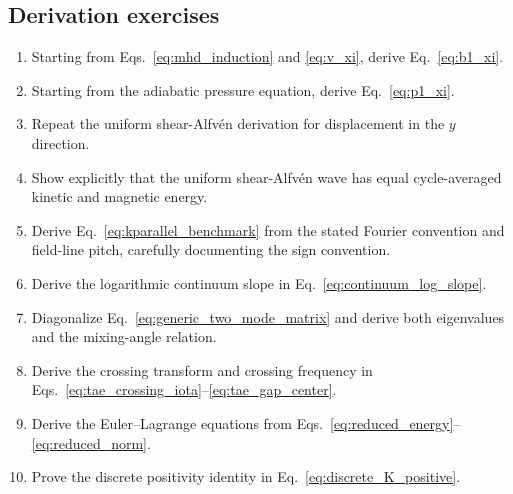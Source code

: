 \subsection{Derivation exercises}
\begin{enumerate}[leftmargin=1.8em]
\item Starting from Eqs.~\eqref{eq:mhd_induction} and \eqref{eq:v_xi}, derive Eq.~\eqref{eq:b1_xi}.
\item Starting from the adiabatic pressure equation, derive Eq.~\eqref{eq:p1_xi}.
\item Repeat the uniform shear-Alfv\'en derivation for displacement in the $y$ direction.
\item Show explicitly that the uniform shear-Alfv\'en wave has equal cycle-averaged kinetic and magnetic energy.
\item Derive Eq.~\eqref{eq:kparallel_benchmark} from the stated Fourier convention and field-line pitch, carefully documenting the sign convention.
\item Derive the logarithmic continuum slope in Eq.~\eqref{eq:continuum_log_slope}.
\item Diagonalize Eq.~\eqref{eq:generic_two_mode_matrix} and derive both eigenvalues and the mixing-angle relation.
\item Derive the crossing transform and crossing frequency in Eqs.~\eqref{eq:tae_crossing_iota}--\eqref{eq:tae_gap_center}.
\item Derive the Euler--Lagrange equations from Eqs.~\eqref{eq:reduced_energy}--\eqref{eq:reduced_norm}.
\item Prove the discrete positivity identity in Eq.~\eqref{eq:discrete_K_positive}.
\end{enumerate}


